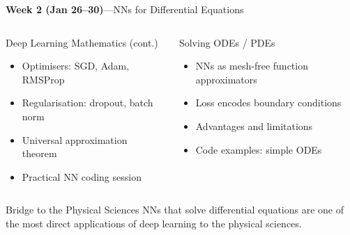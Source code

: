\documentclass[aspectratio=169,11pt]{beamer}
\begin{document}
\begin{frame}{{\color{mlgold}\textbf{Week 2 (Jan 26--30)}\;---\;NNs for Differential Equations}}
  \begin{columns}[T]
      \begin{block}{Deep Learning Mathematics (cont.)}
        \begin{itemize}\itemsep1pt
          \item Optimisers: SGD, Adam, RMSProp
          \item Regularisation: dropout, batch norm
          \item Universal approximation theorem
          \item Practical NN coding session
        \end{itemize}
      \end{block}
      \begin{block}{Solving ODEs / PDEs}
        \begin{itemize}\itemsep1pt
          \item NNs as mesh-free function approximators
          \item Loss encodes boundary conditions
          \item Advantages and limitations
          \item Code examples: simple ODEs
        \end{itemize}
      \end{block}
  \end{columns}
  \vspace{4pt}
  \begin{exampleblock}{Bridge to the Physical Sciences}
    NNs that solve differential equations are one of the most direct
    applications of deep learning to the physical sciences.
  \end{exampleblock}
\end{frame}
\end{document}
